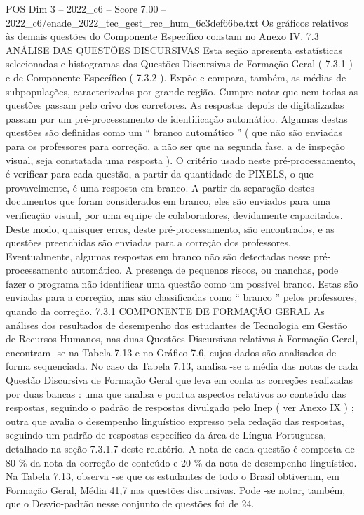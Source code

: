 \begin{textsample}{POS Dim 3 – 2022\_c6 – Score 7.00 – 2022\_c6/enade\_2022\_tec\_gest\_rec\_hum\_6c3def66be.txt}
Os gráficos relativos às demais questões do Componente Específico constam no Anexo IV. 7.3 ANÁLISE DAS QUESTÕES DISCURSIVAS Esta seção apresenta estatísticas selecionadas e histogramas das Questões Discursivas de Formação Geral ( 7.3.1 ) e de Componente Específico ( 7.3.2 ).
Expõe e compara, também, as médias de subpopulações, caracterizadas por grande região.
Cumpre notar que nem todas as questões passam pelo crivo dos corretores.
As respostas depois de digitalizadas passam por um pré-processamento de identificação automático.
Algumas destas questões são definidas como um “ branco automático ” ( que não são enviadas para os professores para correção, a não ser que na segunda fase, a de inspeção visual, seja constatada uma resposta ).
O critério usado neste pré-processamento, é verificar para cada questão, a partir da quantidade de PIXELS, o que provavelmente, é uma resposta em branco.
A partir da separação destes documentos que foram considerados em branco, eles são enviados para uma verificação visual, por uma equipe de colaboradores, devidamente capacitados.
Deste modo, quaisquer erros, deste pré-processamento, são encontrados, e as questões preenchidas são enviadas para a correção dos professores.
Eventualmente, algumas respostas em branco não são detectadas nesse pré-processamento automático.
A presença de pequenos riscos, ou manchas, pode fazer o programa não identificar uma questão como um possível branco.
Estas são enviadas para a correção, mas são classificadas como “ branco ” pelos professores, quando da correção. 7.3.1 COMPONENTE DE FORMAÇÃO GERAL As análises dos resultados de desempenho dos estudantes de Tecnologia em Gestão de Recursos Humanos, nas duas Questões Discursivas relativas à Formação Geral, encontram -se na Tabela 7.13 e no Gráfico 7.6, cujos dados são analisados de forma sequenciada.
No caso da Tabela 7.13, analisa -se a média das notas de cada Questão Discursiva de Formação Geral que leva em conta as correções realizadas por duas bancas : uma que analisa e pontua aspectos relativos ao conteúdo das respostas, seguindo o padrão de respostas divulgado pelo Inep ( ver Anexo IX ) ; outra que avalia o desempenho linguístico expresso pela redação das respostas, seguindo um padrão de respostas específico da área de Língua Portuguesa, detalhado na seção 7.3.1.7 deste relatório.
A nota de cada questão é composta de 80 \% da nota da correção de conteúdo e 20 \% da nota de desempenho linguístico.
Na Tabela 7.13, observa -se que os estudantes de todo o Brasil obtiveram, em Formação Geral, Média 41,7 nas questões discursivas.
Pode -se notar, também, que o Desvio-padrão nesse conjunto de questões foi de 24.

\end{textsample}
